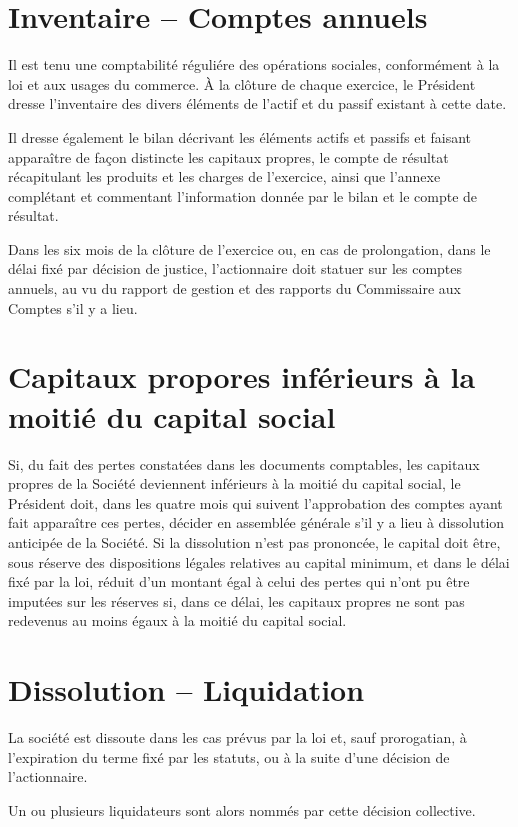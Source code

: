 \documentclass[a4paper,12pt]{report}
\begin{document}
\section{Inventaire -- Comptes annuels}

Il est tenu une comptabilité réguliére des opérations sociales, conformément à la loi et aux usages du commerce. 
À la clôture de chaque exercice, le Président dresse l'inventaire des divers éléments de l'actif et du passif existant à cette date.

Il dresse également le bilan décrivant les éléments actifs et passifs et faisant apparaître de façon distincte les capitaux propres, 
le compte de résultat récapitulant les produits et les charges de l'exercice, ainsi que l'annexe complétant et commentant l'information donnée par le bilan et le compte de résultat.

Dans les six mois de la clôture de l'exercice ou, en cas de prolongation, dans le délai fixé par décision de justice, l'actionnaire doit statuer sur les comptes annuels, 
au vu du rapport de gestion et des rapports du Commissaire aux Comptes s'il y a lieu.

\section{Capitaux propores inférieurs à la moitié du capital social}
Si, du fait des pertes constatées dans les documents comptables, les capitaux propres de la Société deviennent inférieurs à la moitié du capital social, 
le Président doit, dans les quatre mois qui suivent l'approbation des comptes ayant fait apparaître ces pertes, décider en assemblée générale s'il y a lieu à dissolution anticipée de la Société.
Si la dissolution n'est pas prononcée, le capital doit être, sous réserve des dispositions légales relatives au capital minimum, et dans le délai fixé par la loi, 
réduit d'un montant égal à celui des pertes qui n'ont pu être imputées sur les réserves si, dans ce délai, les capitaux propres ne sont pas redevenus au moins égaux à la moitié du capital social.

\section{Dissolution -- Liquidation}
La société est dissoute dans les cas prévus par la loi et, sauf prorogatian, à l'expiration du terme fixé par les statuts, ou à la suite d'une décision de l'actionnaire.

Un ou plusieurs liquidateurs sont alors nommés par cette décision collective.
\end{document}
